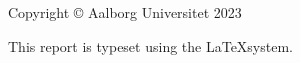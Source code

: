 \thispagestyle{empty}
{\small
\strut\vfill %
\noindent Copyright \copyright{} Aalborg Universitet 2023\par
\vspace{0.2cm}
\noindent This report is typeset using the \LaTeX system.
}
\clearpage

